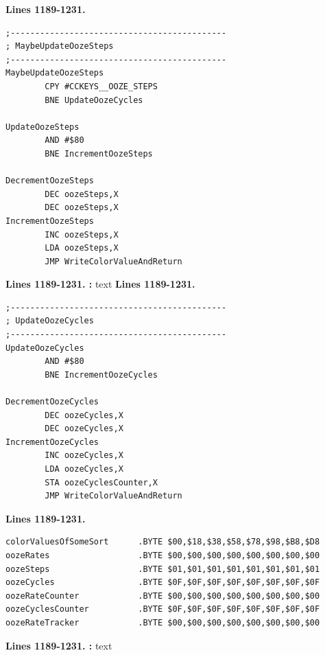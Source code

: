 \textbf{Lines 1189-1231. } 
\begin{lstlisting}
;--------------------------------------------
; MaybeUpdateOozeSteps   
;--------------------------------------------
MaybeUpdateOozeSteps   
        CPY #CCKEYS__OOZE_STEPS
        BNE UpdateOozeCycles

UpdateOozeSteps   
        AND #$80
        BNE IncrementOozeSteps

DecrementOozeSteps   
        DEC oozeSteps,X
        DEC oozeSteps,X
IncrementOozeSteps   
        INC oozeSteps,X
        LDA oozeSteps,X
        JMP WriteColorValueAndReturn

\end{lstlisting}
\clearpage

\textbf{Lines 1189-1231. :} 
text
\clearpage
\textbf{Lines 1189-1231. } 
\begin{lstlisting}
;--------------------------------------------
; UpdateOozeCycles   
;--------------------------------------------
UpdateOozeCycles   
        AND #$80
        BNE IncrementOozeCycles

DecrementOozeCycles   
        DEC oozeCycles,X
        DEC oozeCycles,X
IncrementOozeCycles   
        INC oozeCycles,X
        LDA oozeCycles,X
        STA oozeCyclesCounter,X
        JMP WriteColorValueAndReturn

\end{lstlisting}
\textbf{Lines 1189-1231. } 
\begin{lstlisting}
colorValuesOfSomeSort      .BYTE $00,$18,$38,$58,$78,$98,$B8,$D8
oozeRates                  .BYTE $00,$00,$00,$00,$00,$00,$00,$00
oozeSteps                  .BYTE $01,$01,$01,$01,$01,$01,$01,$01
oozeCycles                 .BYTE $0F,$0F,$0F,$0F,$0F,$0F,$0F,$0F
oozeRateCounter            .BYTE $00,$00,$00,$00,$00,$00,$00,$00
oozeCyclesCounter          .BYTE $0F,$0F,$0F,$0F,$0F,$0F,$0F,$0F
oozeRateTracker            .BYTE $00,$00,$00,$00,$00,$00,$00,$00

\end{lstlisting}
\clearpage

\textbf{Lines 1189-1231. :} 
text

\clearpage

